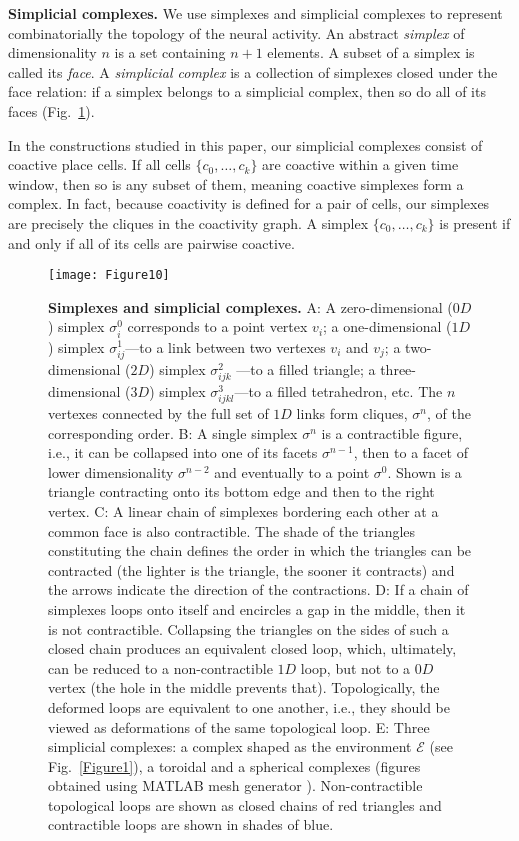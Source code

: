 \documentclass[12pt,tightenlines]{revtex4}
\begin{document}
\textbf{Simplicial complexes.}
We use simplexes and simplicial complexes to represent combinatorially the topology of the neural activity. An abstract 
\emph{simplex} of dimensionality $n$ is a set containing $n+1$ elements. A subset of a simplex is  called its \emph{face}. 
A \emph{simplicial complex} is a collection of simplexes closed under the face relation: if a simplex belongs to a simplicial 
complex, then so do all of its faces (Fig.~\ref{Figure10}).

In the constructions studied in this paper, our simplicial complexes consist of coactive place cells. If all cells $\{c_0,\ldots,c_k\}$
are coactive within a given time window, then so is any subset of them, meaning coactive simplexes form a complex. In fact, 
because coactivity is defined for a pair of cells, our simplexes are precisely the cliques in the coactivity graph. 
A simplex $\{ c_0, \ldots, c_k \}$ is present if and only if all of its cells are pairwise coactive.

\begin{figure}[!h]
\texttt{[image: Figure10]}
\caption{{\footnotesize\textbf{Simplexes and simplicial complexes.} A: A zero-dimensional ($0D$) simplex $\sigma^0_i$ corresponds 
to a point vertex $v_i$; a one-dimensional ($1D$) simplex $\sigma^1_{ij}$---to a link between two vertexes $v_i$ and 
$v_j$; a two-dimensional ($2D$) simplex $\sigma^2_{ijk}$ ---to a filled triangle; a three-dimensional ($3D$) simplex 
$\sigma^3_{ijkl}$---to a filled tetrahedron, etc. The $n$ vertexes connected by the full set of $1D$ links form cliques, 
$\sigma^n$, of the corresponding order. B: A single simplex $\sigma^n$ is a contractible figure, i.e., it can be collapsed 
into one of its facets $\sigma^{n-1}$, then to a facet of lower dimensionality $\sigma^{n-2}$ and eventually to a point 
$\sigma^0$. Shown is a triangle contracting onto its bottom edge and then to the right vertex. 
C: A linear chain of simplexes bordering each other at a common face is also contractible. The shade of the triangles 
constituting the chain defines the order in which the triangles can be contracted (the lighter is the triangle, the sooner 
it contracts) and the arrows indicate the direction of the contractions. D: If a chain of simplexes loops onto itself and 
encircles a gap in the middle, then it is not contractible. Collapsing the triangles on the sides of such a closed chain 
produces an equivalent closed loop, which, ultimately, can be reduced to a non-contractible $1D$ loop, but not to a $0D$ 
vertex (the hole in the middle prevents that). Topologically, the deformed loops are equivalent to one another, i.e., they 
should be viewed as deformations of the same topological loop. E: Three simplicial complexes: a complex shaped as 
the environment $\mathcal{E}$ (see Fig.~\ref{Figure1}), a toroidal and a spherical complexes (figures obtained using 
MATLAB mesh generator \cite{Persson}). Non-contractible topological loops are shown as closed chains of red triangles 
and contractible loops are shown in shades of blue.}}
\label{Figure10}
\end{figure}
\end{document}
